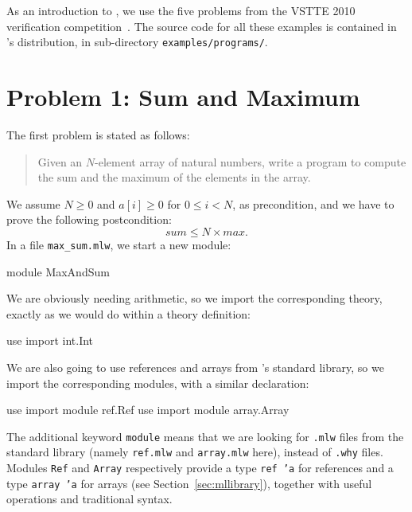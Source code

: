 \medskip
As an introduction to \whyml, we use the five problems from the VSTTE
2010 verification competition~\cite{vstte10comp}.
The source code for all these examples is contained in \why's
distribution, in sub-directory \texttt{examples/programs/}.

\section{Problem 1: Sum and Maximum}

The first problem is stated as follows:
\begin{quote}
  Given an $N$-element array of natural numbers,
  write a program to compute the sum and the maximum of the
  elements in the array.
\end{quote}
We  assume $N \ge 0$ and $a[i] \ge 0$ for $0 \le i < N$, as precondition,
and we have to prove the following postcondition:
\begin{displaymath}
  sum \le N \times max.
\end{displaymath}
In a file \verb|max_sum.mlw|, we start a new module:
\begin{whycode}
module MaxAndSum
\end{whycode}
We are obviously needing arithmetic, so we import the corresponding
theory, exactly as we would do within a theory definition:
\begin{whycode}
  use import int.Int
\end{whycode}
We are also going to use references and arrays from \whyml's standard
library, so we import the corresponding modules, with a similar
declaration:
\begin{whycode}
  use import module ref.Ref
  use import module array.Array
\end{whycode}
The additional keyword \texttt{module} means that we are looking for
\texttt{.mlw} files from the standard library (namely \texttt{ref.mlw}
and \texttt{array.mlw} here), instead of \texttt{.why} files.
Modules \texttt{Ref} and \texttt{Array} respectively provide a type
\texttt{ref 'a} for references and a type \texttt{array 'a} for
arrays (see Section~\ref{sec:mllibrary}), together with useful
operations and traditional syntax.

